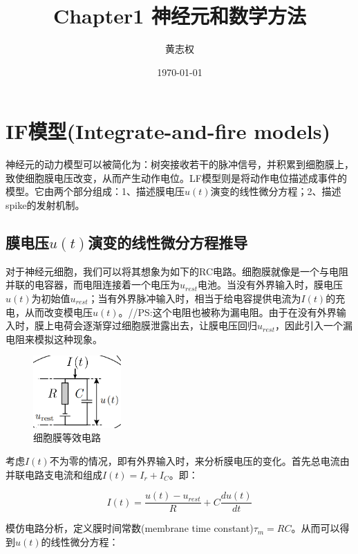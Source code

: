 \documentclass[12pt, a4paper, oneside]{ctexbook}
\title{{\Huge{\textbf{Chapter1 神经元和数学方法}}}}
\author{黄志权}
\date{\today}
\begin{document}
\maketitle

\setcounter{page}{1}

\newpage
{}
\setcounter{page}{1}
\tableofcontents
\newpage
\setcounter{page}{1}

\chapter{IF模型(Integrate-and-fire models)}
神经元的动力模型可以被简化为：树突接收若干的脉冲信号，并积累到细胞膜上，致使细胞膜电压改变，从而产生动作电位。LF模型则是将动作电位描述成事件的模型。它由两个部分组成：1、描述膜电压$u(t)$演变的线性微分方程；2、描述spike的发射机制。

\section{膜电压$u(t)$演变的线性微分方程推导}
对于神经元细胞，我们可以将其想象为如下的RC电路。细胞膜就像是一个与电阻并联的电容器，而电阻连接着一个电压为$u_{rest}$电池。当没有外界输入时，膜电压$u(t)$为初始值$u_{rest}$；当有外界脉冲输入时，相当于给电容提供电流为$I(t)$的充电，从而改变模电压$u(t)$。//PS:这个电阻也被称为漏电阻。由于在没有外界输入时，膜上电荷会逐渐穿过细胞膜泄露出去，让膜电压回归$u_{rest}$，因此引入一个漏电阻来模拟这种现象。

\begin{figure}[H]
    \centering
    \includegraphics[width=0.3\textwidth]{细胞膜等效电路.png}
    \caption{细胞膜等效电路}
\end{figure} 

考虑$I(t)$不为零的情况，即有外界输入时，来分析膜电压的变化。首先总电流由并联电路支电流和组成$I(t)=I_r+I_C$。即：

\begin{equation}
I(t)=\frac{u(t)-u_{rest}}{R}+C\frac{du(t)}{dt}    
\end{equation}

模仿电路分析，定义膜时间常数(membrane time constant)$\tau _m=RC$。从而可以得到$u(t)$的线性微分方程：
\end{document}

